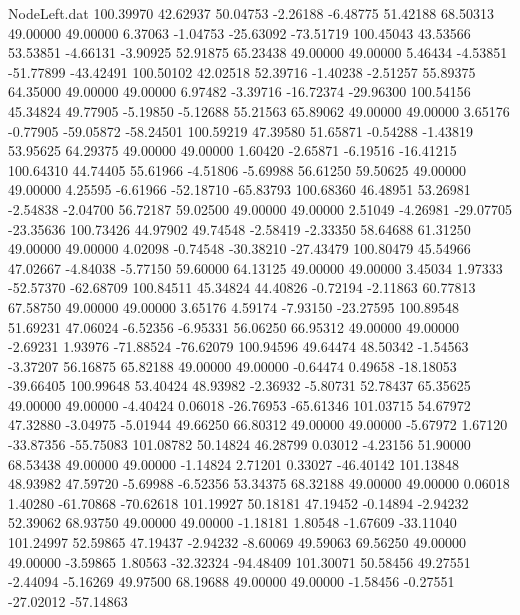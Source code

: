 \begin{filecontents}{NodeLeft.dat}
 100.39970   42.62937   50.04753    -2.26188   -6.48775   51.42188   68.50313   49.00000   49.00000    6.37063   -1.04753  -25.63092  -73.51719
 100.45043   43.53566   53.53851    -4.66131   -3.90925   52.91875   65.23438   49.00000   49.00000    5.46434   -4.53851  -51.77899  -43.42491
 100.50102   42.02518   52.39716    -1.40238   -2.51257   55.89375   64.35000   49.00000   49.00000    6.97482   -3.39716  -16.72374  -29.96300
 100.54156   45.34824   49.77905    -5.19850   -5.12688   55.21563   65.89062   49.00000   49.00000    3.65176   -0.77905  -59.05872  -58.24501
 100.59219   47.39580   51.65871    -0.54288   -1.43819   53.95625   64.29375   49.00000   49.00000    1.60420   -2.65871   -6.19516  -16.41215
 100.64310   44.74405   55.61966    -4.51806   -5.69988   56.61250   59.50625   49.00000   49.00000    4.25595   -6.61966  -52.18710  -65.83793
 100.68360   46.48951   53.26981    -2.54838   -2.04700   56.72187   59.02500   49.00000   49.00000    2.51049   -4.26981  -29.07705  -23.35636
 100.73426   44.97902   49.74548    -2.58419   -2.33350   58.64688   61.31250   49.00000   49.00000    4.02098   -0.74548  -30.38210  -27.43479
 100.80479   45.54966   47.02667    -4.84038   -5.77150   59.60000   64.13125   49.00000   49.00000    3.45034    1.97333  -52.57370  -62.68709
 100.84511   45.34824   44.40826    -0.72194   -2.11863   60.77813   67.58750   49.00000   49.00000    3.65176    4.59174   -7.93150  -23.27595
 100.89548   51.69231   47.06024    -6.52356   -6.95331   56.06250   66.95312   49.00000   49.00000   -2.69231    1.93976  -71.88524  -76.62079
 100.94596   49.64474   48.50342    -1.54563   -3.37207   56.16875   65.82188   49.00000   49.00000   -0.64474    0.49658  -18.18053  -39.66405
 100.99648   53.40424   48.93982    -2.36932   -5.80731   52.78437   65.35625   49.00000   49.00000   -4.40424    0.06018  -26.76953  -65.61346
 101.03715   54.67972   47.32880    -3.04975   -5.01944   49.66250   66.80312   49.00000   49.00000   -5.67972    1.67120  -33.87356  -55.75083
 101.08782   50.14824   46.28799     0.03012   -4.23156   51.90000   68.53438   49.00000   49.00000   -1.14824    2.71201    0.33027  -46.40142
 101.13848   48.93982   47.59720    -5.69988   -6.52356   53.34375   68.32188   49.00000   49.00000    0.06018    1.40280  -61.70868  -70.62618
 101.19927   50.18181   47.19452    -0.14894   -2.94232   52.39062   68.93750   49.00000   49.00000   -1.18181    1.80548   -1.67609  -33.11040
 101.24997   52.59865   47.19437    -2.94232   -8.60069   49.59063   69.56250   49.00000   49.00000   -3.59865    1.80563  -32.32324  -94.48409
 101.30071   50.58456   49.27551    -2.44094   -5.16269   49.97500   68.19688   49.00000   49.00000   -1.58456   -0.27551  -27.02012  -57.14863

\end{filecontents}
